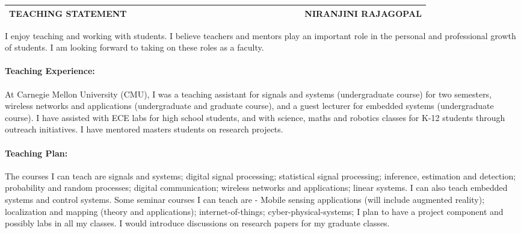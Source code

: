 \documentclass[10pt]{article}
\date{}
\begin{document}

\begin{table}
\color{blue}
\begin{tabular*}{\textwidth}{l r}
\large\textbf{TEACHING STATEMENT} & 
\hfill \ \ \ \ \ \ \ \ \ \ \ \ \ \ \ \ \ \ \ \
\ \ \ \ \ \ \ \ \ \ \ \ \ \ \ 
\large\textbf{NIRANJINI RAJAGOPAL}\\
\hline
\end{tabular*}

\end{table}


I enjoy teaching and working with students.  %
I believe teachers and mentors play an important role in the personal and professional growth of students. I am looking forward to taking on these roles as a faculty.

\paragraph{Teaching Experience:}
At Carnegie Mellon University (CMU), I was a teaching assistant for signals and systems (undergraduate course) for two semesters, wireless networks and applications (undergraduate and graduate course), and a guest lecturer for embedded systems (undergraduate course). I have assisted with ECE labs for high school students, and with science, maths and robotics classes for K-12 students through outreach initiatives. I have mentored masters students on research projects.  

\paragraph{Teaching Plan:}
The courses I can teach are signals and systems;  digital signal processing; statistical signal processing; inference, estimation and detection; probability and random processes; digital communication; wireless networks and applications; linear systems. I can also teach embedded systems and control systems.
Some seminar courses I can teach are - Mobile sensing applications (will include augmented reality); localization and mapping (theory and applications); internet-of-things; cyber-physical-systems; 
I plan to have a project component  and possibly labs in all my classes. I would introduce discussions on research papers for my graduate classes.
\end{document}
